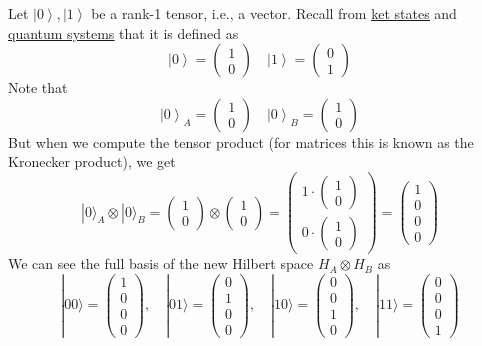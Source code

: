 \documentclass[
]{article}
\let\oldhyperref\hyperref
\renewcommand{\hyperref}[2][]{\oldhyperref[#1]{\underline{#2}}}
\providecommand{\ket}[1]{\left\lvert #1 \right\rangle}
\begin{document}
Let $\ket{0}, \ket{1}$ be a rank-1 tensor, i.e., a vector. Recall from \hyperref[ket-states]{ket states} and \hyperref[quantum-system]{quantum systems} that it is defined as
\[
	\ket{0}=\begin{pmatrix}
		1 \\
		0
	\end{pmatrix}
	\quad
	\ket{1}=\begin{pmatrix}
		0 \\
		1
	\end{pmatrix}
\]
Note that
\[
	\ket{0}_A=\begin{pmatrix} 1 \\ 0 \end{pmatrix}
	\quad
	\ket{0}_B=\begin{pmatrix} 1 \\ 0 \end{pmatrix}
\]
But when we compute the tensor product (for matrices this is known as the Kronecker product), we get
\[
	|0\rangle_A \otimes |0\rangle_B = \begin{pmatrix} 1 \\ 0 \end{pmatrix} \otimes \begin{pmatrix} 1 \\ 0 \end{pmatrix} = \begin{pmatrix} 1 \cdot \begin{pmatrix} 1 \\ 0 \end{pmatrix} \\ 0 \cdot \begin{pmatrix} 1 \\ 0 \end{pmatrix} \end{pmatrix} = \begin{pmatrix} 1 \\ 0 \\ 0 \\ 0 \end{pmatrix}
\]
We can see the full basis of the new Hilbert space $H_A\otimes H_B$ as
\[
	|00\rangle = \begin{pmatrix} 1 \\ 0 \\ 0 \\ 0 \end{pmatrix},\quad |01\rangle = \begin{pmatrix} 0 \\ 1 \\ 0 \\ 0 \end{pmatrix},\quad |10\rangle = \begin{pmatrix} 0 \\ 0 \\ 1 \\ 0 \end{pmatrix},\quad |11\rangle = \begin{pmatrix} 0 \\ 0 \\ 0 \\ 1 \end{pmatrix}
\]
\end{document}
